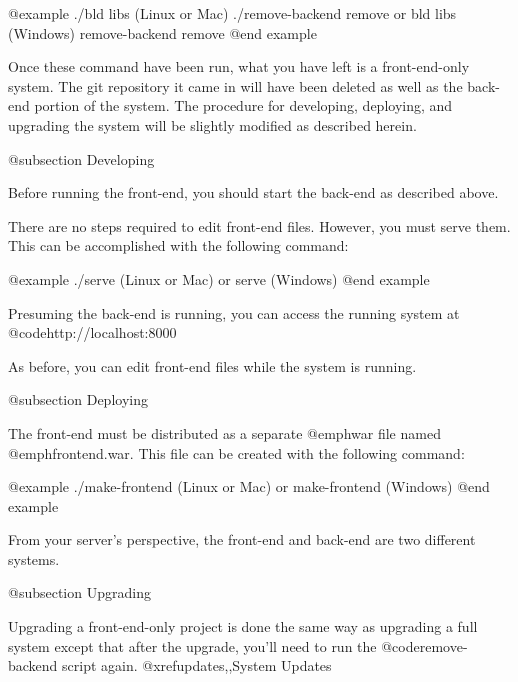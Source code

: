 @example
./bld libs                   (Linux or Mac)
./remove-backend remove
    or
bld libs                     (Windows)
remove-backend remove
@end example

Once these command have been run, what you have left is a front-end-only system.  The git 
repository it came in will have been deleted as well as the back-end portion of the system.
The procedure for developing, deploying, and upgrading the system will be slightly modified as 
described herein.


@subsection Developing

Before running the front-end, you should start the back-end as described above.

There are no steps required to edit front-end files.  However, you must serve them.  This can be accomplished with the following command:

@example
./serve          (Linux or Mac)
    or
serve            (Windows)
@end example

Presuming the back-end is running, you can access the running system at @code{http://localhost:8000}

As before, you can edit front-end files while the system is running.

@subsection Deploying

The front-end must be distributed as a separate @emph{war} file named @emph{frontend.war}.  
This file can be created with the following command:

@example
./make-frontend         (Linux or Mac)
     or
make-frontend           (Windows)
@end example

From your server's perspective, the front-end and back-end are two different systems.

@subsection Upgrading

Upgrading a front-end-only project is done the same way as upgrading a full system except that after the upgrade, you'll need to run the 
@code{remove-backend} script again. @xref{updates,,System Updates}
